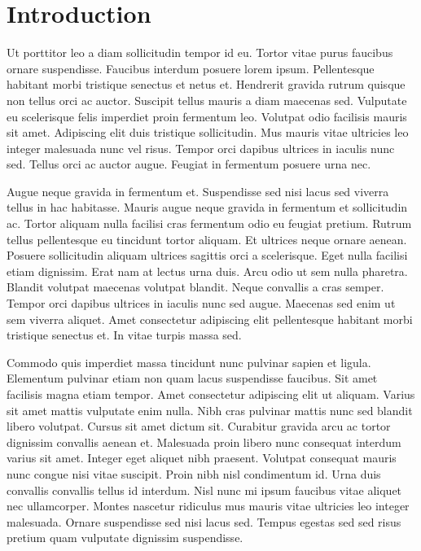 
\chapter{Introduction}
\label{cha:litreview}

Ut porttitor leo a diam sollicitudin tempor id eu. Tortor vitae purus faucibus ornare suspendisse. Faucibus interdum posuere lorem ipsum. Pellentesque habitant morbi tristique senectus et netus et. Hendrerit gravida rutrum quisque non tellus orci ac auctor. Suscipit tellus mauris a diam maecenas sed. Vulputate eu scelerisque felis imperdiet proin fermentum leo. Volutpat odio facilisis mauris sit amet. Adipiscing elit duis tristique sollicitudin. Mus mauris vitae ultricies leo integer malesuada nunc vel risus. Tempor orci dapibus ultrices in iaculis nunc sed. Tellus orci ac auctor augue. Feugiat in fermentum posuere urna nec.

Augue neque gravida in fermentum et. Suspendisse sed nisi lacus sed viverra tellus in hac habitasse. Mauris augue neque gravida in fermentum et sollicitudin ac. Tortor aliquam nulla facilisi cras fermentum odio eu feugiat pretium. Rutrum tellus pellentesque eu tincidunt tortor aliquam. Et ultrices neque ornare aenean. Posuere sollicitudin aliquam ultrices sagittis orci a scelerisque. Eget nulla facilisi etiam dignissim. Erat nam at lectus urna duis. Arcu odio ut sem nulla pharetra. Blandit volutpat maecenas volutpat blandit. Neque convallis a cras semper. Tempor orci dapibus ultrices in iaculis nunc sed augue. Maecenas sed enim ut sem viverra aliquet. Amet consectetur adipiscing elit pellentesque habitant morbi tristique senectus et. In vitae turpis massa sed.

Commodo quis imperdiet massa tincidunt nunc pulvinar sapien et ligula. Elementum pulvinar etiam non quam lacus suspendisse faucibus. Sit amet facilisis magna etiam tempor. Amet consectetur adipiscing elit ut aliquam. Varius sit amet mattis vulputate enim nulla. Nibh cras pulvinar mattis nunc sed blandit libero volutpat. Cursus sit amet dictum sit. Curabitur gravida arcu ac tortor dignissim convallis aenean et. Malesuada proin libero nunc consequat interdum varius sit amet. Integer eget aliquet nibh praesent. Volutpat consequat mauris nunc congue nisi vitae suscipit. Proin nibh nisl condimentum id. Urna duis convallis convallis tellus id interdum. Nisl nunc mi ipsum faucibus vitae aliquet nec ullamcorper. Montes nascetur ridiculus mus mauris vitae ultricies leo integer malesuada. Ornare suspendisse sed nisi lacus sed. Tempus egestas sed sed risus pretium quam vulputate dignissim suspendisse.

